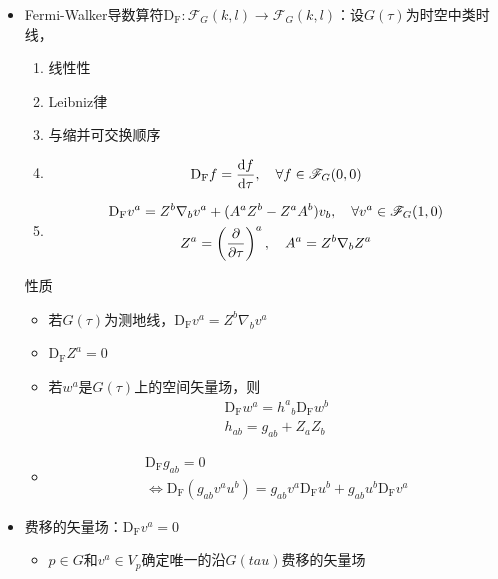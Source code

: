\begin{itemize}
    \item Fermi-Walker导数算符$\mathrm{D}_{\mathrm{F}}: \mathscr{F}_{G}(k, l) \to \mathscr{F}_{G}(k, l)$：设$G(\tau)$为时空中类时线，
    \begin{enumerate}
        \item 线性性
        \item Leibniz律
        \item 与缩并可交换顺序
        \item \begin{gather*}
            \mathrm{D}_{\mathrm{F}} f=\frac{\mathrm{d} f}{\mathrm{d} \tau},\quad \forall f \in \mathscr{F}_{G}(0, 0)
        \end{gather*}
        \item \begin{gather*}
            \mathrm{D}_{\mathrm{F}} v^a=Z^b \nabla_b v^a+(A^a Z^b - Z^a A^b)v_b, \quad \forall v^a \in \mathscr{F}_{G}(1, 0)
            \\
            Z^a = \left(\frac{\partial }{\partial \tau}\right)^a, \quad A^a=Z^b \nabla_b Z^a 
        \end{gather*}
    \end{enumerate}
    性质
    \begin{itemize}
        \item 若$G(\tau)$为测地线，$\mathrm{D}_{\mathrm{F}} v^a=Z^b \nabla_b v^a$
        \item $\mathrm{D}_{\mathrm{F}} Z^a=0$
        \item 若$w^a$是$G(\tau)$上的空间矢量场，则
        \begin{gather*}
            \mathrm{D}_{\mathrm{F}} w^a={h^a}_b \mathrm{D}_{\mathrm{F}} w^b
            \\
            h_{ab}=g_{ab}+Z_a Z_b
        \end{gather*}
        \item \begin{gather*}
            \mathrm{D}_{\mathrm{F}} g_{ab}=0
            \\
            \iff \mathrm{D}_{\mathrm{F}} (g_{ab} v^a u^b)=g_{ab} v^a \mathrm{D}_{\mathrm{F}} u^b+g_{ab} u^b \mathrm{D}_{\mathrm{F}} v^a
        \end{gather*}
    \end{itemize}
    \item 费移的矢量场：$\mathrm{D}_{\mathrm{F}} v^a=0$
    \begin{itemize}
        \item $p \in G$和$v^a \in V_p$确定唯一的沿$G(tau)$费移的矢量场

\end{itemize}
\end{itemize}
